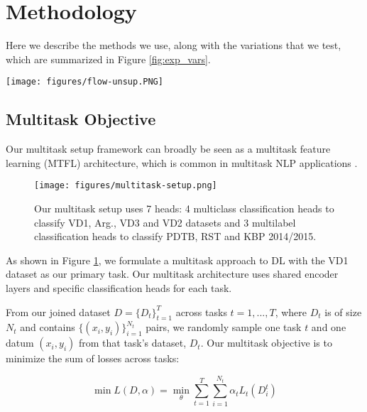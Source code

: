 \documentclass[11pt]{article}
\newcommand\nd{VD1\xspace}
\newcommand\fin{VD2\xspace}
\newcommand\spangh{VD3\xspace}
\newcommand\argumentation{Arg.\xspace}
\begin{document}
\section{Methodology}
\label{sct:methodology}

Here we describe the methods we use, along with the variations that we test, which are summarized in Figure \ref{fig:exp_vars}.

\begin{figure*}[t]
    \centering
    \texttt{[image: figures/flow-unsup.PNG]}
    \caption{Overview of the experimental variations we consider, at each stage of the classification pipeline. \textcolor{darkgreen}{\textbf{Bold green}} indicates variations that had a positive effect on the classification accuracy, and \textcolor{red}{\textit{Italic red}} indicates variations that did not. Some variations are described in the Appendix.}
    \label{fig:exp_vars}
\end{figure*}

\subsection{Multitask Objective}

Our multitask setup framework can broadly be seen as a multitask feature learning (MTFL) architecture, which is common in multitask NLP applications \cite{zhang2017survey}.

\begin{figure}[t]
    \centering
    \texttt{[image: figures/multitask-setup.png]}
    \caption{Our multitask setup uses 7 heads: 4 multiclass classification heads to classify \nd, \argumentation, \spangh and \fin datasets and 3 multilabel classification heads to classify PDTB, RST and KBP 2014/2015.}
    \label{fig:multitask_setup}
\end{figure}

As shown in Figure \ref{fig:multitask_setup}, we formulate a multitask approach to DL with the \nd dataset as our primary task. Our multitask architecture uses shared encoder layers and specific classification heads for each task. 

From our joined dataset $D = \{D_t\}_{t=1}^{T}$ across tasks $t=1,...,T$, where $D_t$ is of size $N_t$ and contains $\{(x_i, y_i)\}_{i=1}^{N_t}$ pairs, we randomly sample one task $t$ and one datum $(x_i, y_i)$ from that task's dataset, $D_t$. Our multitask objective is to minimize the sum of losses across tasks:

\begin{equation}
\label{eq:loss}
\min L(D, \alpha) = \min_{\theta} \sum_{t = 1}^T \sum_{i=1}^{N_t} \alpha_t L_t(D_{i}^{t})
\end{equation}
\end{document}
